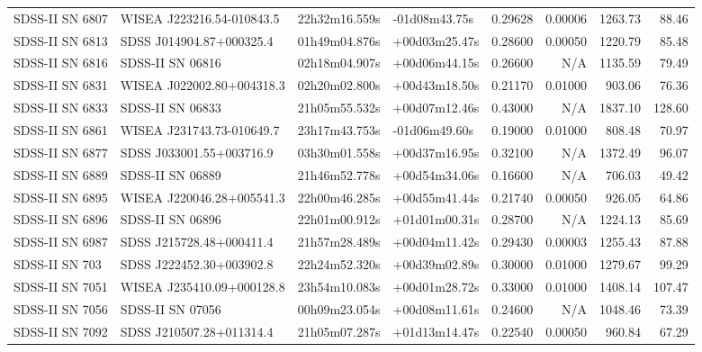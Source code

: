 \begin{longtable}{llllrrrr}
SDSS-II SN 6807  &       WISEA J223216.54-010843.5 &   22h32m16.559s &   -01d08m43.75s &  0.29628 &  0.00006 &  1263.73 &       88.46 \\
SDSS-II SN 6813  &        SDSS J014904.87+000325.4 &   01h49m04.876s &   +00d03m25.47s &  0.28600 &  0.00050 &  1220.79 &       85.48 \\
SDSS-II SN 6816  &                SDSS-II SN 06816 &   02h18m04.907s &   +00d06m44.15s &  0.26600 &      N/A &  1135.59 &       79.49 \\
SDSS-II SN 6831  &       WISEA J022002.80+004318.3 &   02h20m02.800s &   +00d43m18.50s &  0.21170 &  0.01000 &   903.06 &       76.36 \\
SDSS-II SN 6833  &                SDSS-II SN 06833 &   21h05m55.532s &   +00d07m12.46s &  0.43000 &      N/A &  1837.10 &      128.60 \\
SDSS-II SN 6861  &       WISEA J231743.73-010649.7 &   23h17m43.753s &   -01d06m49.60s &  0.19000 &  0.01000 &   808.48 &       70.97 \\
SDSS-II SN 6877  &        SDSS J033001.55+003716.9 &   03h30m01.558s &   +00d37m16.95s &  0.32100 &      N/A &  1372.49 &       96.07 \\
SDSS-II SN 6889  &                SDSS-II SN 06889 &   21h46m52.778s &   +00d54m34.06s &  0.16600 &      N/A &   706.03 &       49.42 \\
SDSS-II SN 6895  &       WISEA J220046.28+005541.3 &   22h00m46.285s &   +00d55m41.44s &  0.21740 &  0.00050 &   926.05 &       64.86 \\
SDSS-II SN 6896  &                SDSS-II SN 06896 &   22h01m00.912s &   +01d01m00.31s &  0.28700 &      N/A &  1224.13 &       85.69 \\
SDSS-II SN 6987  &        SDSS J215728.48+000411.4 &   21h57m28.489s &   +00d04m11.42s &  0.29430 &  0.00003 &  1255.43 &       87.88 \\
SDSS-II SN 703   &        SDSS J222452.30+003902.8 &   22h24m52.320s &   +00d39m02.89s &  0.30000 &  0.01000 &  1279.67 &       99.29 \\
SDSS-II SN 7051  &       WISEA J235410.09+000128.8 &   23h54m10.083s &   +00d01m28.72s &  0.33000 &  0.01000 &  1408.14 &      107.47 \\
SDSS-II SN 7056  &                SDSS-II SN 07056 &   00h09m23.054s &   +00d08m11.61s &  0.24600 &      N/A &  1048.46 &       73.39 \\
SDSS-II SN 7092  &        SDSS J210507.28+011314.4 &   21h05m07.287s &   +01d13m14.47s &  0.22540 &  0.00050 &   960.84 &       67.29 \\

\end{longtable}
